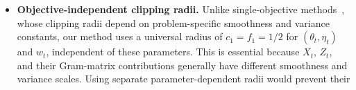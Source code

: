 \documentclass[twoside]{article} %
\def\eqref#1{equation~\ref{#1}}
\theoremstyle{plain}
\theoremstyle{definition}
\theoremstyle{remark}
\newcommand{\HUpsilon}{\hat{\Upsilon}}
\newcommand{\fhL}{\hat{\mathcal{L}}}
\begin{document}
\begin{itemize}[leftmargin = *, topsep = 0pt]
sampling remove the need to set $\beta,\gamma=\mathcal{O}(\epsilon^2)$ and
thereby improve the iteration complexity.
\item \textbf{Objective-independent clipping radii.}
Unlike single-objective methods~\citep{qirevistfDRO,revisitclip,generalizedsmooth}, whose clipping radii depend on problem-specific smoothness and variance constants, our method uses a universal radius of \(c_1=f_1=1/2\) for \((\theta_t,\eta_t)\) and \(w_t\), independent of these parameters. This is essential because $X_t$, $Z_t$, and
their Gram-matrix contributions generally have different smoothness and
variance scales. Using separate parameter-dependent radii would prevent their

\end{itemize}
\end{document}

